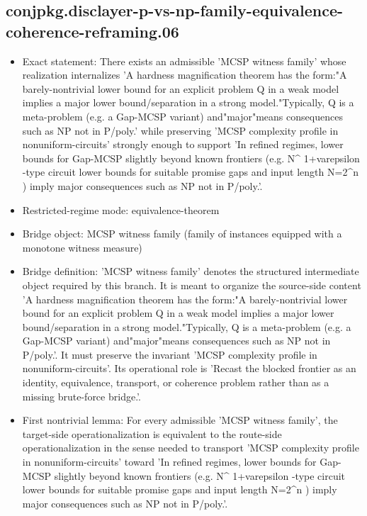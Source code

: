 \documentclass[11pt]{article}
\begin{document}
\subsection*{conjpkg.disclayer-p-vs-np-family-equivalence-coherence-reframing.06}
\begin{itemize}
\item Exact statement: There exists an admissible 'MCSP witness family' whose realization internalizes 'A hardness magnification theorem has the form:"A barely-nontrivial lower bound for an explicit problem Q in a weak model implies a major lower bound/separation in a strong model."Typically, Q is a meta-problem (e.g. a Gap-MCSP variant) and"major"means consequences such as NP not in P/poly.' while preserving 'MCSP complexity profile in nonuniform-circuits' strongly enough to support 'In refined regimes, lower bounds for Gap-MCSP slightly beyond known frontiers (e.g. N\textasciicircum{} 1+varepsilon -type circuit lower bounds for suitable promise gaps and input length N=2\textasciicircum{}n ) imply major consequences such as NP not in P/poly.'.
\item Restricted-regime mode: equivalence-theorem
\item Bridge object: MCSP witness family (family of instances equipped with a monotone witness measure)
\item Bridge definition: 'MCSP witness family' denotes the structured intermediate object required by this branch. It is meant to organize the source-side content 'A hardness magnification theorem has the form:"A barely-nontrivial lower bound for an explicit problem Q in a weak model implies a major lower bound/separation in a strong model."Typically, Q is a meta-problem (e.g. a Gap-MCSP variant) and"major"means consequences such as NP not in P/poly.'. It must preserve the invariant 'MCSP complexity profile in nonuniform-circuits'. Its operational role is 'Recast the blocked frontier as an identity, equivalence, transport, or coherence problem rather than as a missing brute-force bridge.'.
\item First nontrivial lemma: For every admissible 'MCSP witness family', the target-side operationalization is equivalent to the route-side operationalization in the sense needed to transport 'MCSP complexity profile in nonuniform-circuits' toward 'In refined regimes, lower bounds for Gap-MCSP slightly beyond known frontiers (e.g. N\textasciicircum{} 1+varepsilon -type circuit lower bounds for suitable promise gaps and input length N=2\textasciicircum{}n ) imply major consequences such as NP not in P/poly.'.

\end{itemize}
\end{document}
